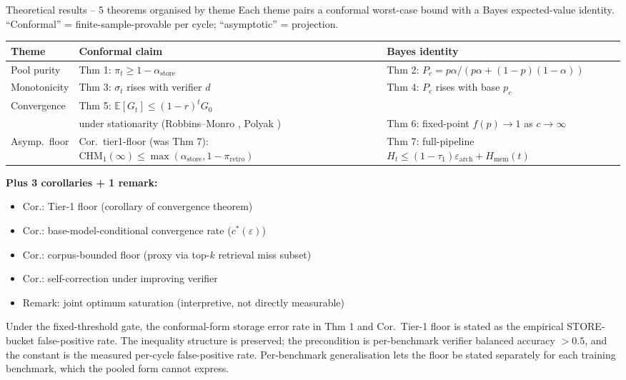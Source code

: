 \documentclass[10pt,aspectratio=169]{beamer}
\begin{document}
\begin{frame}{Theoretical results -- 5 theorems organised by theme}
  \scriptsize
  Each theme pairs a \alert{conformal worst-case bound} with a Bayes expected-value identity. ``Conformal'' = finite-sample-provable per cycle; ``asymptotic'' = projection.

  \vspace{0.3em}
  \begin{tabular}{@{}p{1.6cm}p{6.0cm}p{5.5cm}@{}}
    \toprule
    \textbf{Theme} & \textbf{Conformal claim} & \textbf{Bayes identity} \\
    \midrule
    Pool purity & Thm 1: $\pi_t \ge 1 - \alpha_{\text{store}}$ & Thm 2: $P_c = p\alpha/(p\alpha + (1{-}p)(1{-}\alpha))$ \\
    Monotonicity & Thm 3: $\sigma_t$ rises with verifier $d$ & Thm 4: $P_c$ rises with base $p_c$ \\
    Convergence & Thm 5: $\mathbb{E}[G_t] \le (1{-}r)^t G_0$ \\
                & under stationarity (Robbins--Monro \cite{robbins1951stochastic}, Polyak \cite{polyak1990new}) & Thm 6: fixed-point $f(p) \to 1$ as $c\to\infty$ \\
    Asymp.\ floor & \alert{Cor.\ tier1-floor (was Thm 7):} $\mathrm{CHM}_1(\infty) \le \max(\alpha_{\text{store}}, 1{-}\pi_{\text{retro}})$ & Thm 7: full-pipeline $H_t \le (1{-}\tau_1)\varepsilon_{\text{arch}} + H_{\text{mem}}(t)$ \\
    \bottomrule
  \end{tabular}

  \vspace{0.4em}
  \textbf{Plus 3 corollaries + 1 remark:}
  \begin{itemize}\scriptsize
    \item Cor.: Tier-1 floor (corollary of convergence theorem)
    \item Cor.: base-model-conditional convergence rate ($c^*(\varepsilon)$)
    \item Cor.: corpus-bounded floor (proxy via top-$k$ retrieval miss subset)
    \item Cor.: self-correction under improving verifier
    \item Remark: joint optimum saturation (interpretive, not directly measurable)
  \end{itemize}

  \vspace{0.3em}
  {\scriptsize Under the fixed-threshold gate, the conformal-form storage error rate in Thm 1 and Cor.\ Tier-1 floor is stated as the empirical STORE-bucket false-positive rate. The inequality structure is preserved; the precondition is per-benchmark verifier balanced accuracy $> 0.5$, and the constant is the measured per-cycle false-positive rate. Per-benchmark generalisation lets the floor be stated separately for each training benchmark, which the pooled form cannot express.}
\end{frame}
\end{document}
